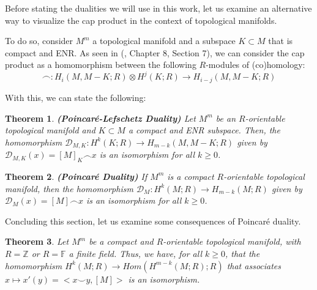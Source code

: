 \documentclass[12pt,oneside]{book}
\newtheorem{teo}    {Theorem}[chapter]
\newcommand{\Z}{\mathbb{Z}}
\newcommand{\F}{\mathbb{F}}
\newcommand{\ccup}{\smile}
\newcommand{\ccap}{\frown}
\newcommand{\tensor}{\otimes}
\begin{document}
    Before stating the dualities we will use in this work, let us examine an alternative way to visualize the cap 
    product  in the context of topological manifolds.

    To do so, consider $M^{m}$ a topological manifold and a subspace $K\subset M$ that is compact and ENR. As seen in (\cite{dold}, 
    Chapter 8, Section 7), we can consider the cap product as a homomorphism between the following $R$-modules of (co)homology:
    $$ \ccap:H_{i}(M,M-K;R)\tensor H^{j}(K;R) \to H_{i-j}(M,M-K;R) $$
    
    With this, we can state the following:
    
    \begin{teo}{\bf (Poincaré-Lefschetz Duality)}
    Let $M^{m}$ be an $R$-orientable topological manifold and $K\subset M$ a compact and ENR subspace. Then, the homomorphism 
    $\mathcal{D}_{M,K}:H^{k}(K;R)\to H_{m-k}(M,M-K;R)$ given by $\mathcal{D}_{M,K}(x)=[M]_{K}\ccap x$ is an isomorphism for all $k\geq 0$.
    \end{teo}
    
    \begin{teo}{\bf (Poincaré Duality)}
    If $M^{m}$ is a compact $R$-orientable topological manifold, then the homomorphism $\mathcal{D}_{M}:H^{k}(M;R)\to H_{m-k}(M;R)$ given 
    by $\mathcal{D}_{M}(x)=[M]\ccap x$ is an isomorphism for all $k\geq 0$.
    \end{teo}
    
    Concluding this section, let us examine some consequences of Poincaré duality.
    
    \begin{teo}\label{base_dual_1}
    Let $M^{m}$ be a compact and $R$-orientable topological manifold, with $R=\Z$ or $R=\F$ a finite field. Thus, we have, for all $k\geq 0$, 
    that the homomorphism $H^{k}(M;R)\to Hom(H^{m-k}(M;R);R)$ that associates $x\mapsto x'(y)=<x\ccup y,[M]>$ is an isomorphism.
    \end{teo}
    
\end{document}
